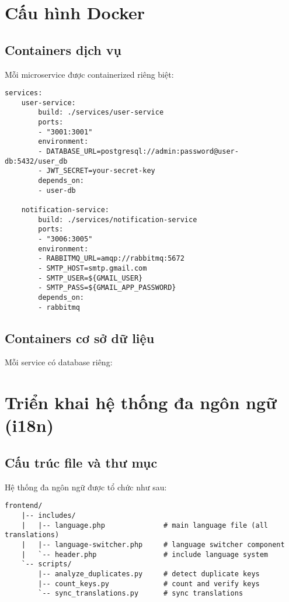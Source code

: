 \documentclass[12pt,a4paper]{report}
\begin{document}
    \section{Cấu hình Docker}

    \subsection{Containers dịch vụ}
    Mỗi microservice được containerized riêng biệt:

    \begin{lstlisting}[language=text, caption=docker-compose.yml excerpt]
    services:
    user-service:
        build: ./services/user-service
        ports:
        - "3001:3001"
        environment:
        - DATABASE_URL=postgresql://admin:password@user-db:5432/user_db
        - JWT_SECRET=your-secret-key
        depends_on:
        - user-db
        
    notification-service:
        build: ./services/notification-service
        ports:
        - "3006:3005"
        environment:
        - RABBITMQ_URL=amqp://rabbitmq:5672
        - SMTP_HOST=smtp.gmail.com
        - SMTP_USER=${GMAIL_USER}
        - SMTP_PASS=${GMAIL_APP_PASSWORD}
        depends_on:
        - rabbitmq
    \end{lstlisting}

    \subsection{Containers cơ sở dữ liệu}
    Mỗi service có database riêng:


    \section{Triển khai hệ thống đa ngôn ngữ (i18n)}

    \subsection{Cấu trúc file và thư mục}
    Hệ thống đa ngôn ngữ được tổ chức như sau:
    \begin{lstlisting}[language=text, caption=i18n directory structure]
    frontend/
    |-- includes/
    |   |-- language.php              # main language file (all translations)
    |   |-- language-switcher.php     # language switcher component
    |   `-- header.php                # include language system
    `-- scripts/
        |-- analyze_duplicates.py     # detect duplicate keys
        |-- count_keys.py             # count and verify keys
        `-- sync_translations.py      # sync translations
    \end{lstlisting}
\end{document}
